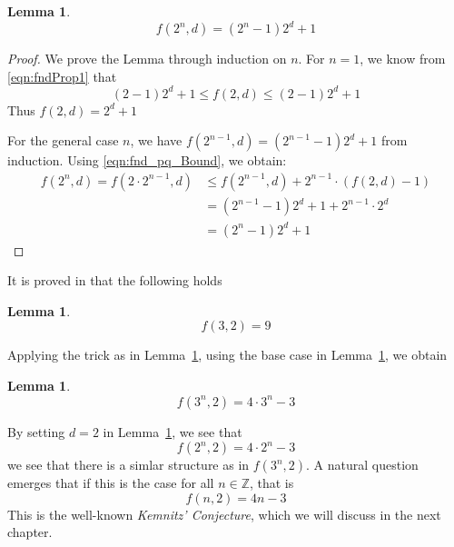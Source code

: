 \documentclass{article}
\theoremstyle{definition}
\newtheorem{lemma}[theorem]{Lemma}
\numberwithin{equation}{theorem}
\numberwithin{figure}{theorem}
\newcommand{\kemnitzConjecture}{\emph{Kemnitz' Conjecture}}
\newcommand{\Integer}{\ensuremath{\mathbb{Z}}}
\newcommand{\fnd}[2]{\ensuremath{f(#1,#2)}}
\begin{document}
    \begin{lemma}\label{lem:f_nd_2_potent}
        \begin{equation*}
            \fnd{2^n}{d} = (2^n - 1) 2^d + 1
        \end{equation*}
    \end{lemma}
    \begin{proof}
        We prove the Lemma through induction on $n$.
        For $n = 1$, we know from \eqref{eqn:fndProp1} that
        \begin{equation*}
            (2 - 1)2^d + 1 \leq \fnd{2}{d} \leq (2 - 1)2^d + 1
        \end{equation*}
        Thus $\fnd{2}{d} = 2^d + 1$

        For the general case $n$, we have $f(2^{n-1},d) = (2^{n-1} - 1)2^d + 1$ from induction.
        Using \eqref{eqn:fnd_pq_Bound}, we obtain:
        \begin{align*}
            \fnd{2^n}{d} = \fnd{2 \cdot 2^{n-1}}{d} &\leq \fnd{2^{n-1}}{d} + 2^{n-1} \cdot (\fnd{2}{d} - 1)\\
            &= (2^{n-1} - 1)2^d + 1 + 2^{n-1} \cdot 2^d\\
            &= (2^n - 1) 2^d + 1
        \end{align*}
    \end{proof}
    It is proved in \cite{Harborth1973} that the following holds
    \begin{lemma}\label{lem:f_3_2_Value_Harborth}
        \begin{equation*}
            \fnd{3}{2} = 9
        \end{equation*}
    \end{lemma}
    Applying the trick as in Lemma~\ref{lem:f_nd_2_potent}, using the base case in Lemma~\ref{lem:f_3_2_Value_Harborth}, we obtain 
    \begin{lemma}\label{lem:f_3Potent_2_value}
        \begin{equation*}
            \fnd{3^n}{2} = 4 \cdot 3^n - 3
        \end{equation*}
    \end{lemma}

    By setting $d = 2$ in Lemma~\ref{lem:f_nd_2_potent}, we see that
    \[\fnd{2^n}{2} = 4 \cdot 2^n - 3\]
    we see that there is a simlar structure as in $\fnd{3^n}{2}$. 
    A natural question emerges that if this is the case for all $n \in \Integer$, that is
    \[\fnd{n}{2} = 4n - 3\]
    This is the well-known \kemnitzConjecture{}, which we will discuss in the next chapter.
\newpage
\end{document}
